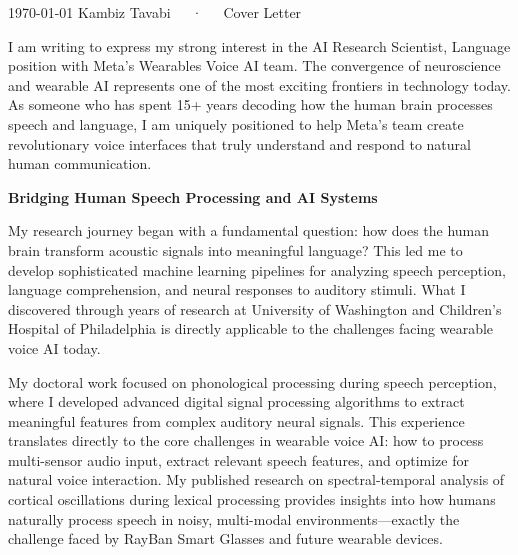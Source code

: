 \documentclass[10.5pt, letterpaper]{russell}
\begin{document}
\makecvheader[R]

\makecvfooter
{\today}
{Kambiz Tavabi~~~·~~~Cover Letter}
{\thepage}

\makelettertitle

\begin{cvletter}
  I am writing to express my strong interest in the AI Research Scientist, Language position with Meta's Wearables Voice AI team. The convergence of neuroscience and wearable AI represents one of the most exciting frontiers in technology today. As someone who has spent 15+ years decoding how the human brain processes speech and language, I am uniquely positioned to help Meta's team create revolutionary voice interfaces that truly understand and respond to natural human communication.

  \textbf{Bridging Human Speech Processing and AI Systems}

  My research journey began with a fundamental question: how does the human brain transform acoustic signals into meaningful language? This led me to develop sophisticated machine learning pipelines for analyzing speech perception, language comprehension, and neural responses to auditory stimuli. What I discovered through years of research at University of Washington and Children's Hospital of Philadelphia is directly applicable to the challenges facing wearable voice AI today.

  My doctoral work focused on phonological processing during speech perception, where I developed advanced digital signal processing algorithms to extract meaningful features from complex auditory neural signals. This experience translates directly to the core challenges in wearable voice AI: how to process multi-sensor audio input, extract relevant speech features, and optimize for natural voice interaction. My published research on spectral-temporal analysis of cortical oscillations during lexical processing provides insights into how humans naturally process speech in noisy, multi-modal environments—exactly the challenge faced by RayBan Smart Glasses and future wearable devices.


\end{cvletter}
\end{document}
